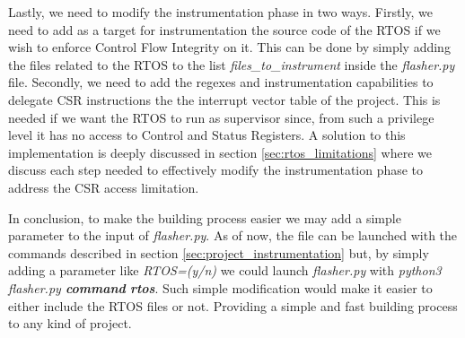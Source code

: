 Lastly, we need to modify the instrumentation phase in two ways. Firstly, we need
to add as a target for instrumentation the source code of the RTOS if we wish to
enforce Control Flow Integrity on it. This can be done by simply adding the
files related to the RTOS to the list \textit{files\_to\_instrument} inside the \textit{flasher.py}
file. Secondly, we need to add the regexes and instrumentation capabilities to
delegate CSR instructions the the interrupt vector table of the project. This is
needed if we want the RTOS to run as supervisor since, from such a privilege
level it has no access to Control and Status Registers. A solution to this implementation
is deeply discussed in section \ref{sec:rtos_limitations} where we discuss each step
needed to effectively modify the instrumentation phase to address the CSR access
limitation.

In conclusion, to make the building process easier we may add a simple parameter
to the input of \textit{flasher.py}. As of now, the file can be launched with the
commands described in section \ref{sec:project_instrumentation} but, by simply
adding a parameter like \textit{RTOS=(y/n)} we could launch \textit{flasher.py}
with \textit{python3 flasher.py \textbf{command} \textbf{rtos}}. Such simple
modification would make it easier to either include the RTOS files or not. Providing
a simple and fast building process to any kind of project.